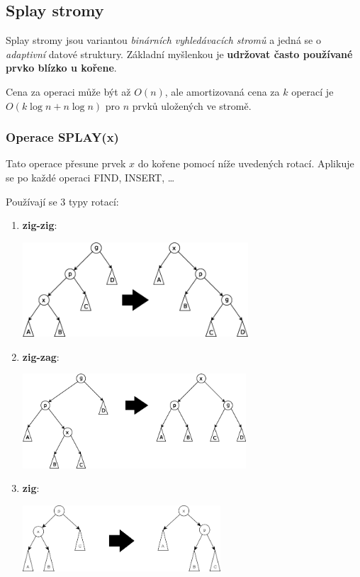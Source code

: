 \documentclass[11pt]{report} %
\numberwithin{equation}{section}
\begin{document}
\subsection{Splay stromy}
Splay stromy jsou variantou \textit{binárních vyhledávacích stromů} a jedná se o \textit{adaptivní} datové struktury. Základní myšlenkou je \textbf{udržovat často používané prvko blízko u kořene}. 

Cena za operaci může být až $O(n)$, ale amortizovaná cena za $k$ operací je $O(k\log n + n \log n)$ pro $n$ prvků uložených ve stromě.

\subsubsection{Operace SPLAY(x)}
Tato operace přesune prvek $x$ do kořene pomocí níže uvedených rotací. Aplikuje se po každé operaci FIND, INSERT, \dots

Používají se 3 typy rotací:
\begin{enumerate}
	
	\item \textbf{zig-zig}:
	
	\includegraphics[height=100pt]{img/zigzig.png}
	
	\item \textbf{zig-zag}:
	
	\includegraphics[height=100pt]{img/zigzag.png}
	
	\item \textbf{zig}:
	
	\includegraphics[height=70pt]{img/zig.png}
\end{enumerate}
\end{document}
